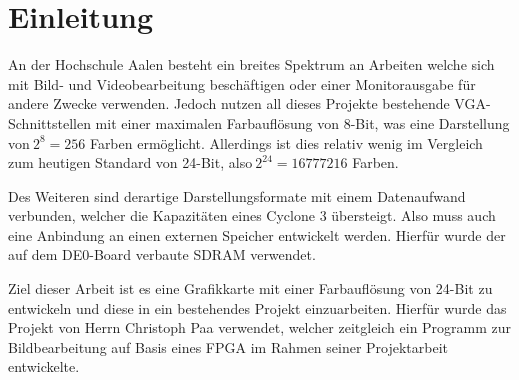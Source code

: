 \chapter{Einleitung}
\label{cha:Einleitung}

An der Hochschule Aalen besteht ein breites Spektrum an Arbeiten welche sich mit Bild- und Videobearbeitung beschäftigen oder einer Monitorausgabe für andere Zwecke verwenden. Jedoch nutzen all dieses Projekte bestehende VGA-Schnittstellen mit einer maximalen Farbauflösung von 8-Bit, was eine Darstellung von$\ 2^{8}=256$ Farben ermöglicht. Allerdings ist dies relativ wenig im Vergleich zum heutigen Standard von 24-Bit, also$\ 2^{24}=16777216$ Farben.

Des Weiteren sind derartige Darstellungsformate mit einem Datenaufwand verbunden, welcher die Kapazitäten eines Cyclone 3 übersteigt. Also muss auch eine Anbindung an einen externen Speicher entwickelt werden. Hierfür wurde der auf dem DE0-Board verbaute SDRAM verwendet.

Ziel dieser Arbeit ist es eine Grafikkarte mit einer Farbauflösung von 24-Bit zu entwickeln und diese in ein bestehendes Projekt einzuarbeiten. Hierfür wurde das Projekt von Herrn Christoph Paa verwendet, welcher zeitgleich ein Programm zur Bildbearbeitung auf Basis eines FPGA im Rahmen seiner Projektarbeit entwickelte.